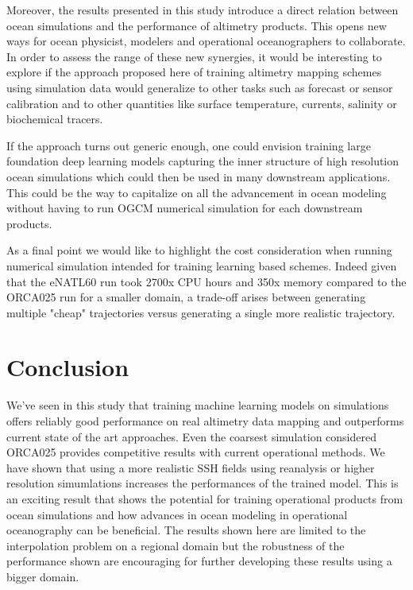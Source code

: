 \begin{bibunit}
Moreover, the results presented in this study introduce a direct relation between ocean simulations and the performance of altimetry products. This opens new ways for ocean physicist, modelers and operational oceanographers to collaborate. In order to assess the range of these new synergies, it would be interesting to explore if the approach proposed here of training altimetry mapping schemes using simulation data would generalize to other tasks such as forecast or sensor calibration and to other quantities like surface temperature, currents, salinity or biochemical tracers.

If the approach turns out generic enough, one could envision training large foundation deep learning models capturing the inner structure of high resolution ocean simulations which could then be used in many downstream applications. This could be the way to capitalize on all the advancement in ocean modeling without having to run OGCM numerical simulation for each downstream products.    

As a final point we would like to highlight the cost consideration when running numerical simulation intended for training learning based schemes. Indeed given that the eNATL60 run took 2700x CPU hours and 350x memory compared to the ORCA025 run for a smaller domain, a trade-off arises between generating multiple "cheap" trajectories versus generating  a single more realistic trajectory. 

\section{Conclusion}
\label{sec:conclusion}
We've seen in this study that training machine learning models on simulations offers reliably good performance on real altimetry data mapping and outperforms current state of the art approaches. Even the coarsest simulation considered ORCA025 provides competitive results with current operational methods. We have shown that using a more realistic SSH fields using reanalysis or higher resolution simumlations increases the performances of the trained model. This is an exciting result that shows the potential for training operational products from ocean simulations and how advances in ocean modeling in operational oceanography can be beneficial. The results shown here are limited to the interpolation problem on a regional domain but the robustness of the performance shown are encouraging for further developing these results using a bigger domain.


\end{bibunit}
% 

